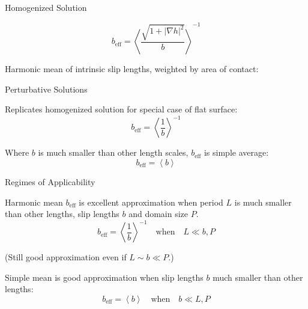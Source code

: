 \documentclass{beamer}
\newcommand{\beff}{\ensuremath{b_{\mathrm{eff}}}}
\begin{document}
\begin{frame}{Homogenized Solution}

\begin{equation}
\beff = \left< \frac{\sqrt{1 + \lvert \nabla h \rvert^2}}{b} \right> ^{-1}
\label{eq:homogharm}
\end{equation}

Harmonic mean of intrinsic slip lengths, weighted by area of contact:

\begin{center}
\end{center}

\end{frame}


\begin{frame}{Perturbative Solutions}

Replicates homogenized solution for special case of flat surface:
\begin{equation}
\beff = \left< \frac{1}{b} \right>^{-1}
\end{equation}

\vspace{1em}
Where $b$ is much smaller than other length scales, $\beff$ is simple average:
\begin{equation}
\beff = \left< b \right>
\end{equation}

\end{frame}


\begin{frame}{Regimes of Applicability}

Harmonic mean $\beff$ is excellent approximation when period $L$ is much smaller than other lengths, slip lengths $b$ and domain size $P$.
\begin{equation}
\beff = \left< \frac{1}{b} \right>^{-1}
\quad \text{when} \quad
L \ll b, P
\end{equation}

(Still good approximation even if $L \sim b \ll P$.)

\vspace{1em}
Simple mean is good approximation when slip lengths $b$ much smaller than other lengths:
\begin{equation}
\beff = \left< b \right>
\quad \text{when} \quad
b \ll L, P
\end{equation}

\end{frame}
\end{document}
